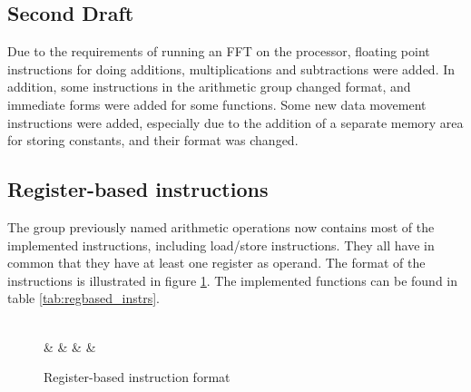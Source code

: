 


\FloatBarrier
\subsection{Second Draft}

Due to the requirements of running an FFT on the processor, floating point instructions for doing additions,
multiplications and subtractions were added. In addition, some instructions in the arithmetic group changed
format, and immediate forms were added for some functions. Some new data movement instructions were added,
especially due to the addition of a separate memory area for storing constants, and their format was changed.

\subsection{Register-based instructions}

The group previously named arithmetic operations now contains most of the implemented instructions, including
load/store instructions. They all have in common that they have at least one register as operand. The format
of the instructions is illustrated in figure \ref{fig:regbased_instrs_format}. The implemented functions can be
found in table \ref{tab:regbased_instrs}.

\begin{figure}[h]
	\centering
	\begin{bytefield}[endianness=big,bitwidth=0.05\linewidth]{16}
		 \\
		 &
		 &
		   &
		 &
	\end{bytefield}

	\caption{Register-based instruction format}
	\label{fig:regbased_instrs_format}
\end{figure}

